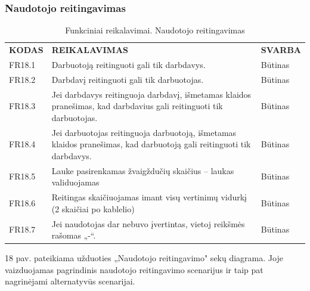 \documentclass{VUMIFPSkursinis}
\begin{document}
\subsubsection{Naudotojo reitingavimas}
\begin{table}[H]
\caption{Funkciniai reikalavimai. Naudotojo reitingavimas}
\centering
\normalsize
\begin{tabular}{|p{2cm}|p{10cm}|p{3cm}|}
\hline
\rowcolor{gray!30}
\multicolumn{3}{|l|}{\textbf{18. Naudotojo reitingavimas}} \\ \hline
\textbf{KODAS}& \multicolumn{1}{m{10cm}|}{\textbf{REIKALAVIMAS}} & \textbf{SVARBA} \\ \hline
FR18.1 & \multicolumn{1}{m{10cm}|}{Darbuotoją reitinguoti gali tik darbdavys.} & Būtinas \\ \hline
FR18.2 & \multicolumn{1}{m{10cm}|}{Darbdavį reitinguoti gali tik darbuotojas.} & Būtinas \\ \hline
FR18.3 & \multicolumn{1}{m{10cm}|}{Jei darbdavys reitinguoja darbdavį, išmetamas klaidos pranešimas, kad darbdavius gali reitinguoti tik darbuotojas.} & Būtinas \\ \hline
FR18.4 & \multicolumn{1}{m{10cm}|}{Jei darbuotojas reitinguoja darbuotoją, išmetamas klaidos pranešimas, kad darbuotoją gali reitinguoti tik darbdavys.} & Būtinas \\ \hline
FR18.5 & \multicolumn{1}{m{10cm}|}{Lauke pasirenkamas žvaigždučių skaičius – laukas validuojamas} & Būtinas \\ \hline
FR18.6 & \multicolumn{1}{m{10cm}|}{Reitingas skaičiuojamas imant visų vertinimų vidurkį (2 skaičiai po kablelio)} & Būtinas \\ \hline
FR18.7 & \multicolumn{1}{m{10cm}|}{Jei naudotojas dar nebuvo įvertintas, vietoj reikšmės rašomas „-“.} & Būtinas \\ \hline
\end{tabular}
\end{table}
18 pav. pateikiama užduoties „Naudotojo reitingavimo" sekų diagrama. Joje vaizduojamas pagrindinis naudotojo reitingavimo scenarijus ir taip pat nagrinėjami alternatyvūs scenarijai.
\end{document}
